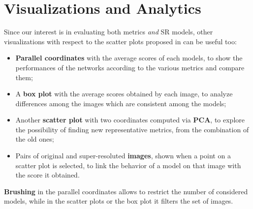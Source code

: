 \documentclass{article}
\begin{document}
	\section{Visualizations and Analytics}

	Since our interest is in evaluating both metrics \textit{and} SR models, other visualizations with respect to the scatter plots proposed in \cite{galasso2013unified} can be useful too:
	\begin{itemize}
		\item \textbf{Parallel coordinates} with the average scores of each models, to show the performances of the networks according to the various metrics and compare them;
		\item A \textbf{box plot} with the average scores obtained by each image, to analyze differences among the images which are consistent among the models;
		\item Another \textbf{scatter plot} with two coordinates computed via \textbf{PCA}, to explore the possibility of finding new representative metrics, from the combination of the old ones;
		\item Pairs of original and super-resoluted \textbf{images}, shown when a point on a scatter plot is selected, to link the behavior of a model on that image with the score it obtained.
	\end{itemize}

	\textbf{Brushing} in the parallel coordinates allows to restrict the number of considered models, while in the scatter plots or the box plot it filters the set of images.

	{\footnotesize
	
	}
\end{document}
